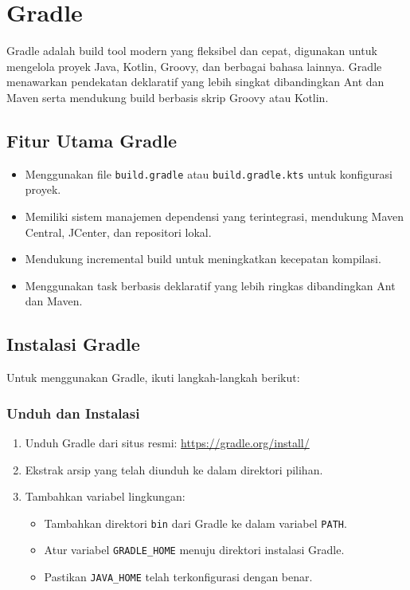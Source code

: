 \section{Gradle}
Gradle adalah build tool modern yang fleksibel dan cepat, digunakan untuk mengelola proyek Java, Kotlin, Groovy, dan berbagai bahasa lainnya. Gradle menawarkan pendekatan deklaratif yang lebih singkat dibandingkan Ant dan Maven serta mendukung build berbasis skrip Groovy atau Kotlin.

\subsection{Fitur Utama Gradle}
\begin{itemize}
	\item Menggunakan file \texttt{build.gradle} atau \texttt{build.gradle.kts} untuk konfigurasi proyek.
	\item Memiliki sistem manajemen dependensi yang terintegrasi, mendukung Maven Central, JCenter, dan repositori lokal.
	\item Mendukung incremental build untuk meningkatkan kecepatan kompilasi.
	\item Menggunakan task berbasis deklaratif yang lebih ringkas dibandingkan Ant dan Maven.
\end{itemize}

\subsection{Instalasi Gradle}
Untuk menggunakan Gradle, ikuti langkah-langkah berikut:

\subsubsection{Unduh dan Instalasi}
\begin{enumerate}
	\item Unduh Gradle dari situs resmi: \url{https://gradle.org/install/}
	\item Ekstrak arsip yang telah diunduh ke dalam direktori pilihan.
	\item Tambahkan variabel lingkungan:
	\begin{itemize}
		\item Tambahkan direktori \texttt{bin} dari Gradle ke dalam variabel \texttt{PATH}.
		\item Atur variabel \texttt{GRADLE\_HOME} menuju direktori instalasi Gradle.
		\item Pastikan \texttt{JAVA\_HOME} telah terkonfigurasi dengan benar.
	\end{itemize}
\end{enumerate}

